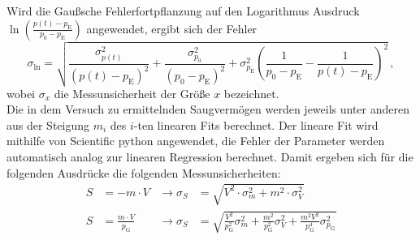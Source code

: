 \noindent Wird die Gaußsche Fehlerfortpflanzung auf den Logarithmus Ausdruck $\ln\left(\frac{p(t) - p_\text{E}}{p_0 - p_\text{E}}\right)$ angewendet, 
ergibt sich der Fehler 
\begin{equation}
    \sigma_{\ln} =\sqrt{\frac{\sigma^2_{p(t)}}{\left(p(t) - p_\text{E}\right)^2} + \frac{\sigma^2_{p_0}}{\left(p_0 - p_\text{E}\right)^2} 
                    + \sigma^2_{p_\text{E}} \left(\frac{1}{p_0 - p_\text{E}} - \frac{1}{p(t) - p_\text{E}}\right)^2 }\, , 
    \label{eqn:err_ln}
\end{equation}
wobei $\sigma_x$ die Messunsicherheit der Größe $x$ bezeichnet.\\
Die in dem Versuch zu ermittelnden Saugvermögen werden jeweils unter anderen aus der Steigung $m_i$ des $i$-ten linearen Fits berechnet. 
Der lineare Fit wird mithilfe von Scientific python \cite{numpy} angewendet, die Fehler der Parameter werden automatisch analog zur linearen Regression berechnet. 
Damit ergeben sich für die folgenden Ausdrücke die folgenden Messunsicherheiten:
\begin{align}
    S &= - m \cdot V & \rightarrow \sigma_S &= \sqrt{V^2\cdot \sigma_m^2 + m^2 \cdot \sigma_V^2} \label{eqn:err_saug_eva}\\
    S &= \frac{m\cdot V}{p_\text{G}} & \rightarrow \sigma_S &= \sqrt{\frac{V^2}{p_\text{G}^2} \sigma_m^2 + \frac{m^2}{p_\text{G}^2} \sigma_V^2 + \frac{m^2V^2}{p_\text{G}^4} \sigma_{p_{\text{G}}}^2 } \label{eqn:err_saug_leck}
\end{align}
